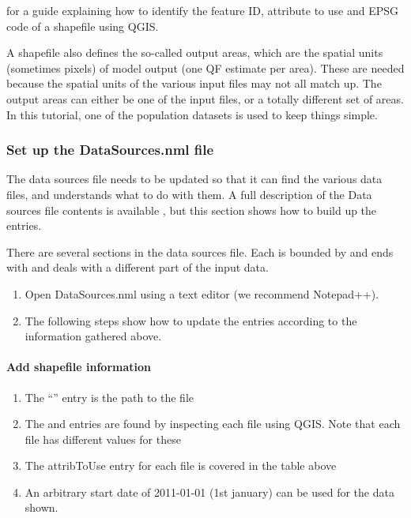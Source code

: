\documentclass[letterpaper,10pt,english]{sphinxmanual}
\begin{document}
for a guide explaining how to identify the feature ID, attribute to use
and EPSG code of a shapefile using QGIS.

A shapefile also defines the so-called output areas, which are the
spatial units (sometimes pixels) of model output (one QF estimate per
area). These are needed because the spatial units of the various input
files may not all match up. The output areas can either be one of the
input files, or a totally different set of areas. In this tutorial, one
of the population datasets is used to keep things simple.


\subsubsection{Set up the DataSources.nml file}
\label{\detokenize{Tutorials/GQF:set-up-the-datasources-nml-file}}
The data sources file needs to be updated so that it can find the
various data files, and understands what to do with them. A full
description of the Data sources file contents is available
, but this section shows how to
build up the entries.

There are several sections in the data sources file. Each is bounded by
 and ends with  and deals with a different part
of the input data.
\begin{enumerate}
\item {} 
Open DataSources.nml using a text editor (we recommend Notepad++).

\item {} 
The following steps show how to update the entries according to the
information gathered above.

\end{enumerate}


\paragraph{Add shapefile information}
\label{\detokenize{Tutorials/GQF:add-shapefile-information}}\begin{enumerate}
\item {} 
The “” entry is the path to the file

\item {} 
The  and  entries are found by inspecting
each file using QGIS. Note that each file has different values for
these

\item {} 
The attribToUse entry for each file is covered in the table above

\item {} 
An arbitrary start date of 2011-01-01 (1st january) can be used for
the data shown.

\end{enumerate}
\end{document}
